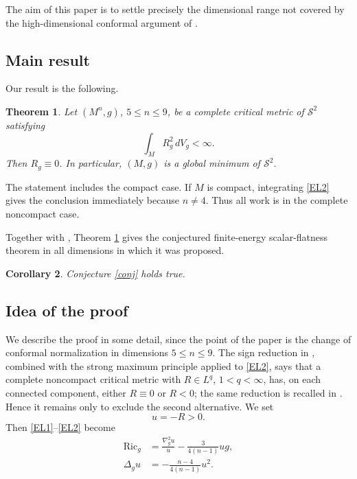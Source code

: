 \documentclass[11pt]{amsart}
\numberwithin{equation}{section}
\newtheorem{theorem}{Theorem}[section]
\newtheorem{corollary}[theorem]{Corollary}
\DeclareMathOperator{\Ric}{Ric}
\newcommand{\Hess}{\nabla^2}
\begin{document}
The aim of this paper is to settle precisely the dimensional range not covered by the high-dimensional conformal argument of \cite{CMM2026}.

\subsection{Main result}

Our result is the following.

\begin{theorem}\label{thm:main}
Let \((M^n,g)\), \(5\leq n\leq 9\), be a complete critical metric of \(\mathcal S^2\) satisfying
$$
        \int_M R_g^2\,dV_g<\infty .
$$
Then \(R_g\equiv 0\).  In particular, \((M,g)\) is a global minimum of \(\mathcal S^2\).
\end{theorem}

The statement includes the compact case.  If $M$ is compact, integrating \eqref{EL2} gives the conclusion immediately because $n\ne4$.  Thus all work is in the complete noncompact case.

Together with \cite[Theorem~1.1]{CMM2026}, Theorem \ref{thm:main} gives the conjectured finite-energy scalar-flatness theorem in all dimensions in which it was proposed.

\begin{corollary}\label{cor:full-conjecture}
Conjecture \ref{conj} holds true.
\end{corollary}

\subsection{Idea of the proof}

We describe the proof in some detail, since the point of the paper is the change of conformal normalization in dimensions $5\le n\le9$.  The sign reduction in \cite[Lemma~5.1]{CMM2023}, combined with the strong maximum principle applied to \eqref{EL2}, says that a complete noncompact critical metric with $R\in L^q$, $1<q<\infty$, has, on each connected component, either $R\equiv0$ or $R<0$; the same reduction is recalled in \cite[Section~2]{CMM2026}.  Hence it remains only to exclude the second alternative.  We set
$$
        u=-R>0.
$$
Then \eqref{EL1}--\eqref{EL2} become
\begin{align}
        \Ric_g &= \frac{\Hess_g u}{u}-\frac{3}{4(n-1)}u g, \label{intro-uRic}\\
        \Delta_g u &= -\frac{n-4}{4(n-1)}u^2 . \label{intro-uLap}
\end{align}
\end{document}
